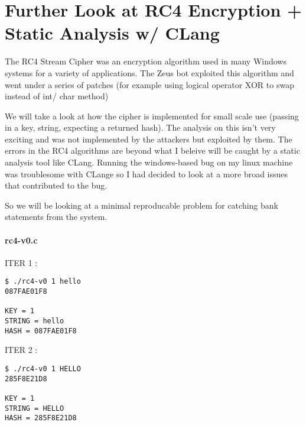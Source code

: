 \begin{Shaded}
\begin{Highlighting}[]
\NormalTok{    decData[m] = decData[m]\^{} decData[m{-}}\NormalTok{];}
\NormalTok{    \}}
\end{Highlighting}
\end{Shaded}

\hypertarget{further-look-at-rc4-encryption--static-analysis-w-clang}{%
\section{Further Look at RC4 Encryption + Static Analysis w/
CLang}\label{further-look-at-rc4-encryption--static-analysis-w-clang}}

The RC4 Stream Cipher was an encryption algorithm used in many Windows
systems for a variety of applications. The Zeus bot exploited this
algorithm and went under a series of patches (for example using logical
operator XOR to swap instead of int/ char method)

We will take a look at how the cipher is implemented for small scale use
(passing in a key, string, expecting a returned hash). The analysis on
this isn't very exciting and was not implemented by the attackers but
exploited by them. The errors in the RC4 algorithms are beyond what I
beleive will be caught by a static analysis tool like CLang. Running the
windows-based bug on my linux machine was troublesome with CLange so I
had decided to look at a more broad issues that contributed to the bug.

So we will be looking at a minimal reproducable problem for catching
bank statements from the system.

\hypertarget{rc4-v0c}{%
\paragraph{rc4-v0.c}\label{rc4-v0c}}

ITER 1 :

\begin{verbatim}
$ ./rc4-v0 1 hello
087FAE01F8

KEY = 1
STRING = hello
HASH = 087FAE01F8
\end{verbatim}

ITER 2 :

\begin{verbatim}
$ ./rc4-v0 1 HELLO
285F8E21D8

KEY = 1
STRING = HELLO
HASH = 285F8E21D8
\end{verbatim}

